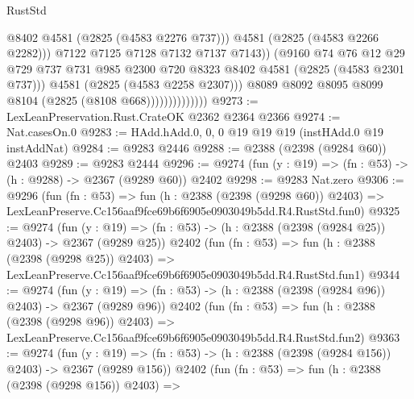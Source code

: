 \begin{lexlean}{RustStd}
\begin{coremodule}
                                      @8402
                                      @4581
                                      (@2825 (@4583 @2276 @737)))
                                    @4581
                                    (@2825 (@4583 @2266 @2282)))
                                  @7122
                                  @7125
                                  @7128
                                  @7132
                                  @7137
                                  @7143))
                              (@9160
                                @74
                                @76
                                @12
                                @29
                                @729
                                @737
                                @731
                                @985
                                @2300
                                @720
                                @8323
                                @8402
                                @4581
                                (@2825 (@4583 @2301 @737)))
                              @4581
                              (@2825 (@4583 @2258 @2307)))
                            @8089
                            @8092
                            @8095
                            @8099
                            @8104
                            (@2825 (@8108 @668))))))))))))))
@9273 := LexLeanPreservation.Rust.CrateOK @2362 @2364 @2366
@9274 := Nat.casesOn.{0}
@9283 := HAdd.hAdd.{0, 0, 0} @19 @19 @19 (instHAdd.{0} @19 instAddNat)
@9284 := @9283 @2446
@9288 := @2388 (@2398 (@9284 @60)) @2403
@9289 := @9283 @2444
@9296 := @9274 (fun (y : @19) => (fn : @53) -> (h : @9288) -> @2367 (@9289 @60)) @2402
@9298 := @9283 Nat.zero
@9306 := @9296
    (fun (fn : @53) =>
    fun (h : @2388 (@2398 (@9298 @60)) @2403) =>
    LexLeanPreserve.Cc156aaf9fce69b6f6905e0903049b5dd.R4.RustStd.fun0)
@9325 := @9274
    (fun (y : @19) => (fn : @53) -> (h : @2388 (@2398 (@9284 @25)) @2403) -> @2367 (@9289 @25))
    @2402
    (fun (fn : @53) =>
    fun (h : @2388 (@2398 (@9298 @25)) @2403) =>
    LexLeanPreserve.Cc156aaf9fce69b6f6905e0903049b5dd.R4.RustStd.fun1)
@9344 := @9274
    (fun (y : @19) => (fn : @53) -> (h : @2388 (@2398 (@9284 @96)) @2403) -> @2367 (@9289 @96))
    @2402
    (fun (fn : @53) =>
    fun (h : @2388 (@2398 (@9298 @96)) @2403) =>
    LexLeanPreserve.Cc156aaf9fce69b6f6905e0903049b5dd.R4.RustStd.fun2)
@9363 := @9274
    (fun (y : @19) => (fn : @53) -> (h : @2388 (@2398 (@9284 @156)) @2403) -> @2367 (@9289 @156))
    @2402
    (fun (fn : @53) =>
    fun (h : @2388 (@2398 (@9298 @156)) @2403) =>

\end{coremodule}
\end{lexlean}
